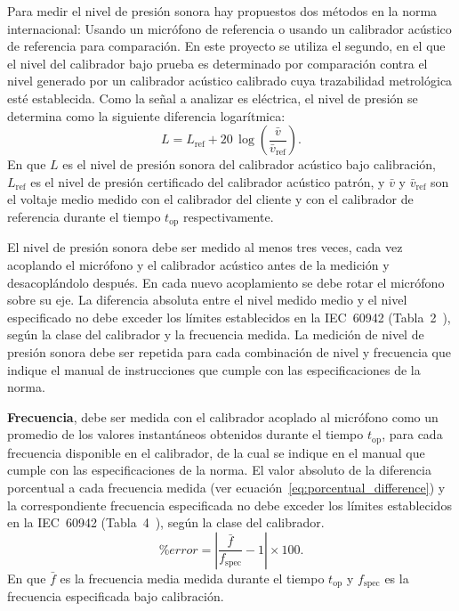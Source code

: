 Para medir el nivel de presión sonora hay propuestos dos métodos en la norma internacional: Usando un micrófono de referencia o usando un calibrador acústico de referencia para comparación.
En este proyecto se utiliza el segundo, en el que el nivel del calibrador bajo prueba es determinado por comparación contra el nivel generado por un calibrador acústico calibrado cuya trazabilidad metrológica esté establecida.
Como la señal a analizar es eléctrica, el nivel de presión se determina como la siguiente diferencia logarítmica:
\begin{equation}
    \label{eq:spl_from_voltage}
    L = L_{\mathrm{ref}} + 20\,\log\left(\frac{\bar{v}}{\bar{v}_{\mathrm{ref}}}\right).
\end{equation}
%
En que $L$ es el nivel de presión sonora del calibrador acústico bajo calibración, $L_{\mathrm{ref}}$ es el nivel de presión certificado del calibrador acústico patrón, y $\bar{v}$ y $\bar{v}_{\mathrm{ref}}$ son el voltaje medio medido con el calibrador del cliente y con el calibrador de referencia durante el tiempo $t_{\mathrm{op}}$ respectivamente.

El nivel de presión sonora debe ser medido al menos tres veces, cada vez acoplando el micrófono y el calibrador acústico antes de la medición y desacoplándolo después.
En cada nuevo acoplamiento se debe rotar el micrófono sobre su eje.
La diferencia absoluta entre el nivel medido medio y el nivel especificado no debe exceder los límites establecidos en la \mbox{IEC 60942} (\mbox{Tabla 2}~\citeyear{IEC_TC29_2017}), según la clase del calibrador y la frecuencia medida.
La medición de nivel de presión sonora debe ser repetida para cada combinación de nivel y frecuencia que indique el manual de instrucciones que cumple con las especificaciones de la norma.

\textbf{Frecuencia}, debe ser medida con el calibrador acoplado al micrófono como un promedio de los valores instantáneos obtenidos durante el tiempo $t_{\mathrm{op}}$, para cada frecuencia disponible en el calibrador, de la cual se indique en el manual que cumple con las especificaciones de la norma.
El valor absoluto de la diferencia porcentual a cada frecuencia medida (ver ecuación~\ref{eq:porcentual_difference}) y la correspondiente frecuencia especificada no debe exceder los límites establecidos en la \mbox{IEC 60942} (\mbox{Tabla 4}~\citeyear{IEC_TC29_2017}), según la clase del calibrador.
%
\begin{equation}
    \label{eq:porcentual_difference}
    \%error = \left|\frac{\bar{f}}{f_{\mathrm{spec}}} - 1\right| \times 100.
\end{equation}
%
En que $\bar{f}$ es la frecuencia media medida durante el tiempo $t_{\mathrm{op}}$ y $f_{\mathrm{spec}}$ es la frecuencia especificada bajo calibración.

